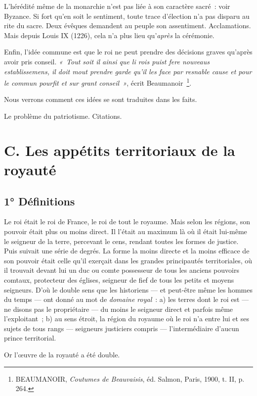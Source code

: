 \documentclass[french,twoside]{book} %
\begin{document}
L’hérédité même de la monarchie n’est pas liée à son caractère sacré : voir Byzance. Si fort qu’en soit le sentiment, toute trace d’élection n’a pas disparu au rite du sacre. Deux évêques demandent au peuple son assentiment. Acclamations. Mais depuis Louis IX (1226), cela n’a plus lieu qu’{\itshape après} la cérémonie.\par
Enfin, l’idée commune est que le roi ne peut prendre des décisions graves qu’après avoir pris conseil. \emph{« Tout soit il ainsi que li rois puist fere nouveaus establissemens, il doit mout prendre garde qu’il les face par resnable cause et pour le commun pourfit et sur grant conseil »}, écrit Beaumanoir \footnote{ BEAUMANOIR, {\itshape Coutumes de Beauvaisis}, éd. Salmon, Paris, 1900, t. II, p. 264.}.\par
Nous verrons comment ces idées se sont traduites dans les faits.\par
Le problème du patriotisme. Citations.
\section[{C. Les appétits territoriaux de la royauté}]{C. Les appétits territoriaux de la royauté}
\label{c03c}
\subsection[{1° Définitions}]{1° Définitions}
\label{c03c1}
\noindent Le roi était le roi de France, le roi de tout le royaume. Mais selon les régions, son pouvoir était plus ou moins direct. Il l’était au maximum là où il était lui-même le seigneur de la terre, percevant le cens, rendant toutes les formes de justice. Puis suivait une série de degrés. La forme la moins directe et la moins efficace de son pouvoir était celle qu’il exerçait dans les grandes principautés territoriales, où il trouvait devant lui un duc ou comte possesseur de tous les anciens pouvoirs comtaux, protecteur des églises, seigneur de fief de tous les petits et moyens seigneurs. D’où le double sens que les historiens — et peut-être même les hommes du temps — ont donné au mot de {\itshape domaine royal} : a) les terres dont le roi est — ne disons pas le propriétaire — du moins le seigneur direct et parfois même l’exploitant ; b) au sens étroit, la région du royaume où le roi n’a entre lui et ses sujets de tous rangs — seigneurs justiciers compris — l’intermédiaire d’aucun prince territorial.\par
Or l’œuvre de la royauté a été double.\par
\end{document}
